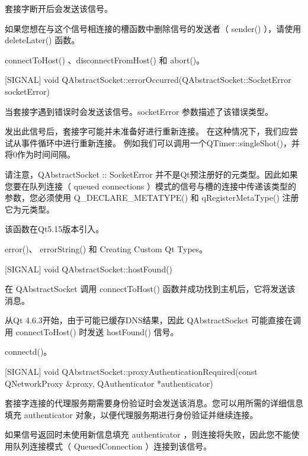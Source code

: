 套接字断开后会发送该信号。

\begin{warning}
如果您想在与这个信号相连接的槽函数中删除信号的发送者（ sender() ），请使用 deleteLater() 函数。
\end{warning}


\begin{seeAlso}
connectToHost() 、disconnectFromHost() 和 abort()。
\end{seeAlso}

\splitLine

[SIGNAL] void
QAbstractSocket::errorOccurred(QAbstractSocket::SocketError
socketError)

当套接字遇到错误时会发送该信号。socketError 参数描述了该错误类型。

发出此信号后，套接字可能并未准备好进行重新连接。 在这种情况下，我们应尝试从事件循环中进行重新连接。 例如我们可以调用一个QTimer::singleShot()，并将0作为时间间隔。

请注意，QAbstractSocket :: SocketError 并不是Qt预注册好的元类型。因此如果您要在队列连接（ queued connections ）模式的信号与槽的连接中传递该类型的参数，您必须使用 Q\_DECLARE\_METATYPE() 和 qRegisterMetaType() 注册它为元类型。

该函数在Qt5.15版本引入。


\begin{seeAlso}
error()、 errorString() 和 Creating Custom Qt Types。
\end{seeAlso}


[SIGNAL] void QAbstractSocket::hostFound()

在 QAbstractSocket 调用 connectToHost() 函数并成功找到主机后，它将发送该消息。

\begin{notice}
从Qt 4.6.3开始，由于可能已缓存DNS结果，因此 QAbstractSocket 可能直接在调用 connectToHost() 时发送 hostFound() 信号。
\end{notice}



\begin{seeAlso}
connectd()。
\end{seeAlso}

[SIGNAL] void QAbstractSocket::proxyAuthenticationRequired(const
QNetworkProxy \&proxy, QAuthenticator *authenticator)

套接字连接的代理服务期需要身份验证时会发送该消息。您可以用所需的详细信息填充 authenticator 对象，以便代理服务期进行身份验证并继续连接。


\begin{notice}
如果信号返回时未使用新信息填充 authenticator ，则连接将失败，因此您不能使用队列连接模式（ QueuedConnection ）连接到该信号。
\end{notice}


